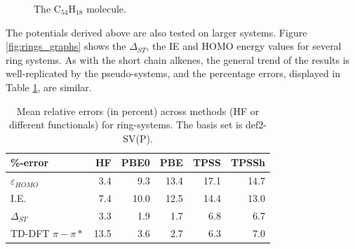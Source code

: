\documentclass[aip,reprint]{revtex4-1}
\begin{document}
\begin{figure}
\begin{center}
\end{center}
\caption{\label{fig:c54h18}The C\(_{54}\)H\(_{18}\) molecule.}
\end{figure}

The potentials derived above are also tested on larger systems.
Figure \ref{fig:rings_graphs} shows the $\Delta_{ST}$, the IE and
HOMO energy values for several ring systems.
As with the short chain alkenes, the general trend of the results is well-replicated
by the pseudo-systems, and the percentage errors, displayed in Table
\ref{table:ring_system_errors}, are similar.

\begin{table}[ht]
\caption{Mean relative errors (in percent) across methods (HF or different functionals)
for ring-systems.
The basis set is def2-SV(P).}
\begin{tabular}{l r r r r r }
\hline\hline
\%-error                & HF & PBE0 & PBE & TPSS & TPSSh \\
\hline
$\varepsilon_{HOMO}$    & 3.4 &  9.3  & 13.4 & 17.1 & 14.7 \\
I.E.                    & 7.4 & 10.0  & 12.5 & 14.4 & 13.0 \\
$\Delta_{ST}$           & 3.3 &  1.9  &  1.7 &  6.8 &  6.7 \\
TD-DFT $\pi-\pi*$       & 13.5 &  3.6  &  2.7 &  6.3 &  7.0 \\ 
\hline\hline
\end{tabular}
\label{table:ring_system_errors}
\end{table}
\end{document}
